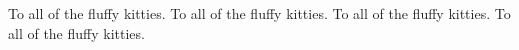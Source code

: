 
To all of the fluffy kitties. To all of the fluffy kitties. To all of the fluffy kitties. To all of
the fluffy kitties. 

